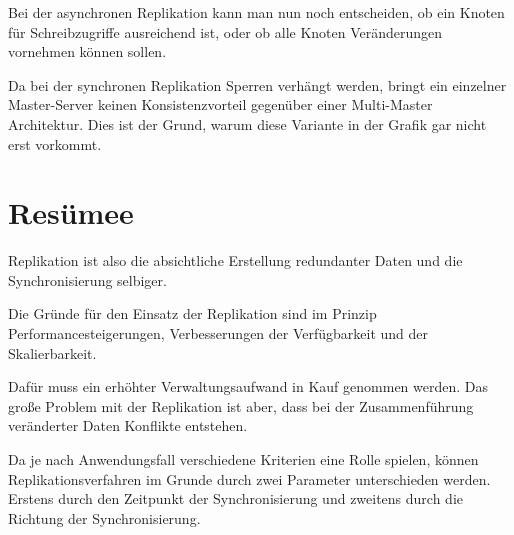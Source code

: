 Bei der asynchronen Replikation kann man nun noch entscheiden, ob ein Knoten für Schreibzugriffe ausreichend ist, oder ob alle Knoten Veränderungen vornehmen können sollen.

Da bei der synchronen Replikation Sperren verhängt werden, bringt ein einzelner Master-Server keinen Konsistenzvorteil gegenüber einer Multi-Master Architektur. Dies ist der Grund, warum diese Variante in der Grafik gar nicht erst vorkommt.

\section{Resümee}

Replikation ist also die absichtliche Erstellung redundanter Daten und die Synchronisierung selbiger.

Die Gründe für den Einsatz der Replikation sind im Prinzip Performancesteigerungen, Verbesserungen der Verfügbarkeit und der Skalierbarkeit.

Dafür muss ein erhöhter Verwaltungsaufwand in Kauf genommen werden. Das große Problem mit der Replikation ist aber, dass bei der Zusammenführung veränderter Daten Konflikte entstehen.

Da je nach Anwendungsfall verschiedene Kriterien eine Rolle spielen, können Replikationsverfahren im Grunde durch zwei Parameter unterschieden werden. Erstens durch den Zeitpunkt der Synchronisierung und zweitens durch die Richtung der Synchronisierung.